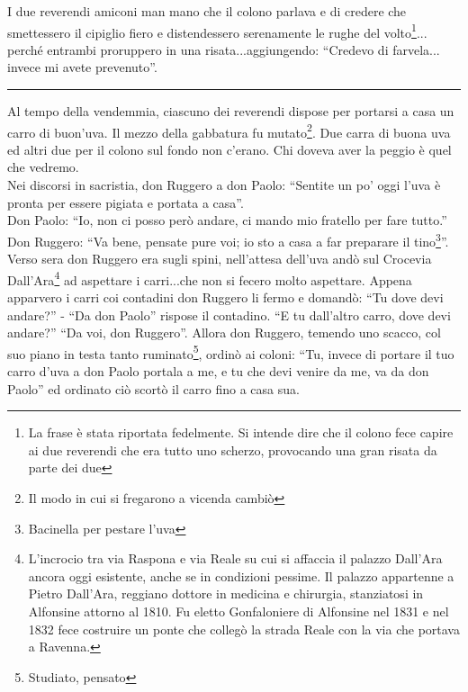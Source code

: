 I due reverendi amiconi man mano che il colono parlava e di credere che smettessero il cipiglio fiero e distendessero serenamente le rughe del volto\footnote{La frase è stata riportata fedelmente. Si intende dire che il colono fece capire ai due reverendi che era tutto uno scherzo, provocando una gran risata da parte dei due}... perché entrambi proruppero in una risata...aggiungendo: “Credevo di farvela... invece mi avete prevenuto”.
\begin{center}
\rule{1.5cm}{0.4pt}
\end{center}
Al tempo della vendemmia, ciascuno dei reverendi dispose per portarsi a casa un carro di buon’uva. Il mezzo della gabbatura fu mutato\footnote{Il modo in cui si fregarono a vicenda cambiò}. Due carra di buona uva ed altri due per il colono sul fondo non c’erano. Chi doveva aver la peggio è quel che vedremo. \\
Nei discorsi in sacristia, don Ruggero a don Paolo: “Sentite un po' oggi l’uva è pronta per essere pigiata e portata a casa”.\\
Don Paolo: “Io, non ci posso però andare, ci mando mio fratello per fare tutto.”\\
Don Ruggero: “Va bene, pensate pure voi; io sto a casa a far preparare il tino\footnote{Bacinella per pestare l'uva}”.\\
Verso sera don Ruggero era sugli spini, nell’attesa dell’uva andò sul Crocevia Dall’Ara\footnote{L'incrocio tra via Raspona e via Reale su cui si affaccia il palazzo Dall'Ara ancora oggi esistente, anche se in condizioni pessime. Il palazzo appartenne a Pietro Dall'Ara, reggiano dottore in medicina e chirurgia, stanziatosi in Alfonsine attorno al 1810. Fu eletto Gonfaloniere di Alfonsine nel 1831 e nel 1832 fece costruire un ponte che collegò la strada Reale con la via che portava a Ravenna.} ad aspettare i carri...che non si fecero molto aspettare. Appena apparvero i carri coi contadini don Ruggero li fermo e domandò: “Tu dove devi andare?” - “Da don Paolo” rispose il contadino. “E tu dall’altro carro, dove devi andare?” “Da voi, don Ruggero”. Allora don Ruggero, temendo uno scacco, col suo piano in testa tanto ruminato\footnote{Studiato, pensato}, ordinò ai coloni: “Tu, invece di portare il tuo carro d’uva a don Paolo portala a me, e tu che devi venire da me, va da don Paolo” ed ordinato ciò scortò il carro fino a casa sua.\\

